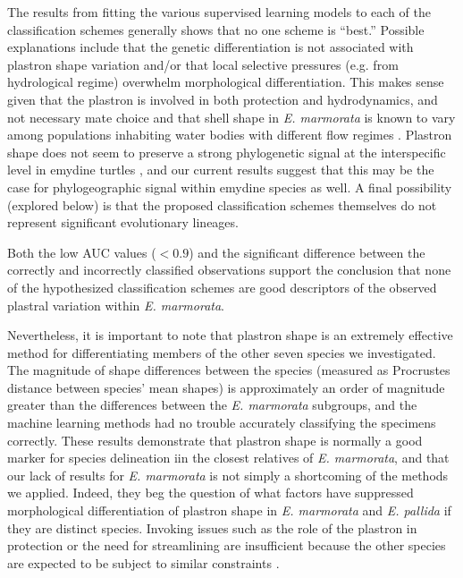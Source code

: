 \documentclass[12pt,letterpaper]{article}
\begin{document}
The results from fitting the various supervised learning models to each of the classification schemes generally shows that no one scheme is ``best.'' Possible explanations include that the genetic differentiation is not associated with plastron shape variation and/or that local selective pressures (e.g. from hydrological regime) overwhelm morphological differentiation. This makes sense given that the plastron is involved in both protection and hydrodynamics, and not necessary mate choice \citep{Rivera2008,Rivera2011,Stayton2011,Rivera2014} and that shell shape in \textit{E. marmorata} is known to vary among populations inhabiting water bodies with different flow regimes \citep{Holland1992,Lubcke2007,Germano2009}. Plastron shape does not seem to preserve a strong phylogenetic signal at the interspecific level in emydine turtles \citep{Angielczyk2011}, and our current results suggest that this may be the case for phylogeographic signal within emydine species as well. A final possibility (explored below) is that the proposed classification schemes themselves do not represent significant evolutionary lineages.

Both the low AUC values (\(< 0.9\)) and the significant difference between the correctly and incorrectly classified observations support the conclusion that none of the hypothesized classification schemes are good descriptors of the observed plastral variation within \textit{E. marmorata}.

Nevertheless, it is important to note that plastron shape is an extremely effective method for differentiating members of the other seven species we investigated. The magnitude of shape differences between the species (measured as Procrustes distance between species' mean shapes) is approximately an order of magnitude greater than the differences between the \textit{E. marmorata} subgroups, and the machine learning methods had no trouble accurately classifying the specimens correctly. These results demonstrate that plastron shape is normally a good marker for species delineation iin the closest relatives of \textit{E. marmorata}, and that our lack of results for \textit{E. marmorata} is not simply a shortcoming of the methods we applied. Indeed, they beg the question of what factors have suppressed morphological differentiation of plastron shape in \textit{E. marmorata} and \textit{E. pallida} if they are distinct species. Invoking issues such as the role of the plastron in protection or the need for streamlining are insufficient because the other species are expected to be subject to similar constraints \citep{Stayton2011,Pollyb}. 
\end{document}
